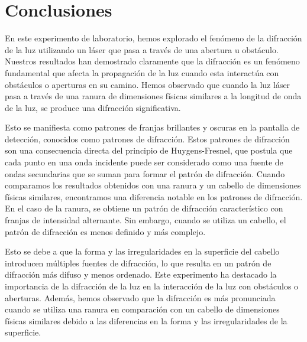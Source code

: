 \documentclass[twocolumn, 12pt]{article}
\begin{document}
\section{Conclusiones}

En este experimento de laboratorio, hemos explorado el
fenómeno de la difracción de la luz utilizando un láser que
pasa a través de una abertura u obstáculo. Nuestros
resultados han demostrado claramente que la difracción es
un fenómeno fundamental que afecta la propagación de la luz
cuando esta interactúa con obstáculos o aperturas en su
camino. Hemos observado que cuando la luz láser pasa a
través de una ranura de dimensiones físicas similares a la
longitud de onda de la luz, se produce una difracción
significativa.

Esto se manifiesta como patrones de franjas brillantes y
oscuras en la pantalla de detección, conocidos como
patrones de difracción. Estos patrones de difracción son
una consecuencia directa del principio de Huygens-Fresnel,
que postula que cada punto en una onda incidente puede ser
considerado como una fuente de ondas secundarias que se
suman para formar el patrón de difracción. Cuando
comparamos los resultados obtenidos con una ranura y un
cabello de dimensiones físicas similares, encontramos una
diferencia notable en los patrones de difracción. En el
caso de la ranura, se obtiene un patrón de difracción
característico con franjas de intensidad alternante. Sin
embargo, cuando se utiliza un cabello, el patrón de
difracción es menos definido y más complejo.

Esto se debe a que la forma y las irregularidades en la
superficie del cabello introducen múltiples fuentes de
difracción, lo que resulta en un patrón de difracción más
difuso y menos ordenado. Este experimento ha destacado la
importancia de la difracción de la luz en la interacción de
la luz con obstáculos o aberturas. Además, hemos observado
que la difracción es más pronunciada cuando se utiliza una
ranura en comparación con un cabello de dimensiones físicas
similares debido a las diferencias en la forma y las
irregularidades de la superficie.

\printbibliography
\end{document}
